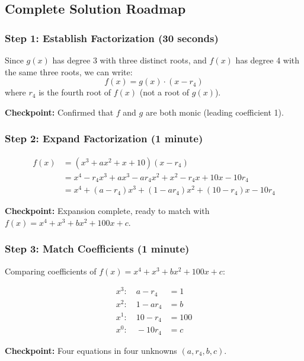 \documentclass[]{article}
\begin{document}
\begin{solutionbox}
\subsection*{Complete Solution Roadmap}

\subsubsection*{Step 1: Establish Factorization (30 seconds)}

Since $g(x)$ has degree 3 with three distinct roots, and $f(x)$ has degree 4 with the same three roots, we can write:
\[f(x) = g(x) \cdot (x - r_4)\]
where $r_4$ is the fourth root of $f(x)$ (not a root of $g(x)$).

\textbf{Checkpoint:} Confirmed that $f$ and $g$ are both monic (leading coefficient 1).

\subsubsection*{Step 2: Expand Factorization (1 minute)}

\begin{align*}
f(x) &= (x^3 + ax^2 + x + 10)(x - r_4) \\
&= x^4 - r_4x^3 + ax^3 - ar_4x^2 + x^2 - r_4x + 10x - 10r_4 \\
&= x^4 + (a-r_4)x^3 + (1-ar_4)x^2 + (10-r_4)x - 10r_4
\end{align*}

\textbf{Checkpoint:} Expansion complete, ready to match with $f(x) = x^4 + x^3 + bx^2 + 100x + c$.

\subsubsection*{Step 3: Match Coefficients (1 minute)}

Comparing coefficients of $f(x) = x^4 + x^3 + bx^2 + 100x + c$:

\begin{align}
x^3: \quad a - r_4 &= 1 \tag{1} \\
x^2: \quad 1 - ar_4 &= b \tag{2} \\
x^1: \quad 10 - r_4 &= 100 \tag{3} \\
x^0: \quad -10r_4 &= c \tag{4}
\end{align}

\textbf{Checkpoint:} Four equations in four unknowns $(a, r_4, b, c)$.


\end{solutionbox}
\end{document}

